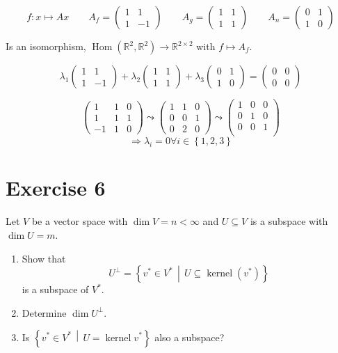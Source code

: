 \documentclass[a4paper]{article}
\theoremstyle{definition}
\DeclareMathOperator\kernel{kernel}
\DeclareMathOperator\Hom{Hom}
\newcommand\set[1]{\left\{#1\right\}}
\newcommand\setdef[2]{\left\{#1\,\middle|\,#2\right\}}
\begin{document}
\[ f: x \mapsto Ax \qquad A_f = \begin{pmatrix} 1 & 1 \\ 1 & -1 \end{pmatrix} \qquad A_g = \begin{pmatrix} 1 & 1 \\ 1 & 1 \end{pmatrix} \qquad A_n = \begin{pmatrix} 0 & 1 \\ 1 & 0 \end{pmatrix} \]

Is an isomorphism, $\Hom(\mathbb R^2, \mathbb R^2) \to \mathbb R^{2 \times 2}$ with $f \mapsto A_f$.

\[ \lambda_1 \begin{pmatrix} 1 & 1 \\ 1 & -1 \end{pmatrix} + \lambda_2 \begin{pmatrix} 1 & 1 \\ 1 & 1 \end{pmatrix} + \lambda_3 \begin{pmatrix} 0 & 1 \\ 1 & 0 \end{pmatrix} = \begin{pmatrix} 0 & 0 \\ 0 & 0 \end{pmatrix} \]

\[
  \begin{pmatrix}
    1 & 1 & 0 \\
    1 & 1 & 1 \\
    -1 & 1 & 0
  \end{pmatrix}
  \leadsto
  \begin{pmatrix}
    1 & 1 & 0 \\
    0 & 0 & 1 \\
    0 & 2 & 0
  \end{pmatrix}
  \leadsto
  \begin{pmatrix}
    1 & 0 & 0 \\
    0 & 1 & 0 \\
    0 & 0 & 1 \\
  \end{pmatrix}
\]
\[ \Rightarrow \lambda_i = 0 \forall i \in \set{1,2,3} \]

\section{Exercise 6}
\begin{ex}
  Let $V$ be a vector space with $\dim{V} = n < \infty$ and $U \subseteq V$ is a
  subspace with $\dim{U} = m$.
  \begin{enumerate}
    \item Show that
      \[ U^\bot = \setdef{v^* \in V^*}{U \subseteq \kernel(v^*)} \]
      is a subspace of $V^*$.
    \item Determine $\dim{U^\bot}$.
    \item Is $\setdef{v^* \in V^*}{U = \kernel{v^*}}$ also a subspace?
  \end{enumerate}
\end{ex}
\end{document}
